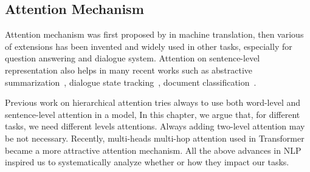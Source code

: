\subsection{Attention Mechanism}
\label{ssec:sentential:attention}

Attention mechanism was first proposed by \citet{bahdanau2014neural}
in machine translation, then various of extensions has been invented
and widely used in other tasks, especially for question answering and
dialogue
system\cite{matchlstm,bidaf,sukhbaatar15mnet,fei17gmnet,P18-1157}.
Attention on sentence-level representation also helps in many recent
works such as abstractive summarization~\cite{P18-1013}, dialogue
state tracking~\cite{zhou2018multi,zhou2016multi}, document
classification~\cite{yang2016hierarchical}.

Previous work on hierarchical attention\cite{yang2016hierarchical}
tries always to use both word-level and sentence-level attention in a
model, In this chapter, we argue that, for different tasks, we need
different levels attentions. Always adding two-level attention may be
not necessary. Recently, multi-heads multi-hop attention used in
Transformer \cite{NIPS2017_7181} became a more attractive attention
mechanism. All the above advances in NLP inspired us to systematically
analyze whether or how they impact our tasks.


